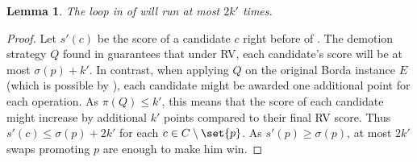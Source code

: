 \documentclass[letterpaper]{article} %
\newtheorem{lemma}{Lemma}
\begin{document}
\begin{lemma} \label{2t-loopLemma}
The loop in  of  will run at most $2k'$ times.
\end{lemma}
\begin{proof}
Let $s'(c)$ be the score of a candidate $c$ right before  of .
The demotion strategy $Q$  found in  guarantees that under RV, each candidate's score will be at most $\sigma(p)+k'$. In contrast, when applying $Q$ on the original Borda instance $E$ (which is possible by ), each candidate might be awarded one additional point for each operation. As $\pi(Q) \leq k'$, this means that the score of each candidate might increase by additional $k'$ points compared to their final RV score. Thus $s'(c) \leq \sigma(p) + 2k'$ for each $c \in C \setminus \set{p}$.
As $s'(p) \geq \sigma(p)$, at most $2k'$ swaps promoting $p$ are enough to make him win.
\end{proof}
\end{document}
